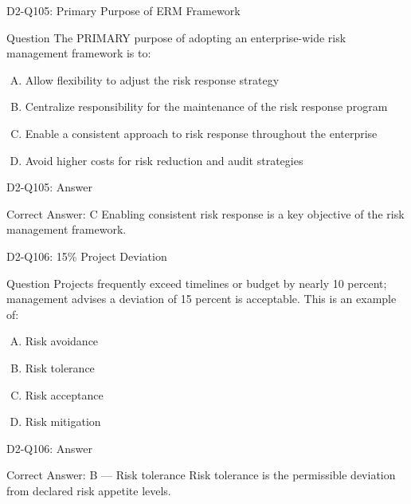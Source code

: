 \documentclass{beamer}
\begin{document}
	\begin{frame}{D2-Q105: Primary Purpose of ERM Framework}
		\begin{block}{Question}
			The PRIMARY purpose of adopting an enterprise-wide risk management framework is to:
		\end{block}
		\begin{enumerate}[(A)]
			\item Allow flexibility to adjust the risk response strategy
			\item Centralize responsibility for the maintenance of the risk response program
			\item Enable a consistent approach to risk response throughout the enterprise
			\item Avoid higher costs for risk reduction and audit strategies
		\end{enumerate}
	\end{frame}
	\begin{frame}{D2-Q105: Answer}
		\begin{block}{Correct Answer: C}
			Enabling consistent risk response is a key objective of the risk management framework.
		\end{block}
	\end{frame}
	
	\begin{frame}{D2-Q106: 15\% Project Deviation}
		\begin{block}{Question}
			Projects frequently exceed timelines or budget by nearly 10 percent; management advises a deviation of 15 percent is acceptable. This is an example of:
		\end{block}
		\begin{enumerate}[(A)]
			\item Risk avoidance
			\item Risk tolerance
			\item Risk acceptance
			\item Risk mitigation
		\end{enumerate}
	\end{frame}
	\begin{frame}{D2-Q106: Answer}
		\begin{block}{Correct Answer: B --- Risk tolerance}
			Risk tolerance is the permissible deviation from declared risk appetite levels.
		\end{block}
	\end{frame}
	
\end{document}
